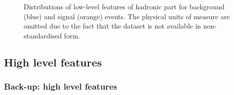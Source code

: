 \documentclass[xcolor=table,8pt]{beamer}
\begin{document}
\begin{frame}[t]
\begin{figure}[!h]
\begin{minipage}[c]{0.25\linewidth}
{                    \label{fig:appendix_low_features_hadronic_j4_btag}
                }
            \end{minipage}%
            \caption{Distributions of low-level features of hadronic part for background (blue) and signal (orange) events. The physical units of measure are omitted due to the fact that the dataset is not available in non-standardised form.}
            \label{fig:appendix_low_features_hadronic_part2}
        \end{figure}
    \end{frame}
    
    
    \subsection{High level features}
    \begin{frame}[t]
        \frametitle{Back-up: high level features}


\end{frame}
\end{document}
